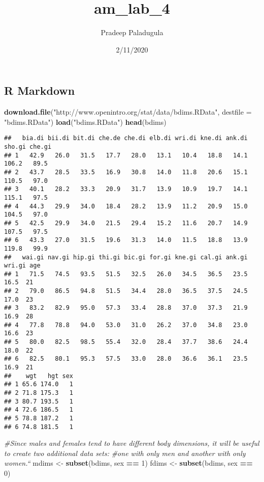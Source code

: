 \documentclass[]{article}
\title{am\_lab\_4}
\author{Pradeep Paladugula}
\date{2/11/2020}
\newenvironment{Shaded}{\begin{snugshade}}{\end{snugshade}}
\newcommand{\CommentTok}[1]{\textcolor[rgb]{0.56,0.35,0.01}{\textit{#1}}}
\newcommand{\DataTypeTok}[1]{\textcolor[rgb]{0.13,0.29,0.53}{#1}}
\newcommand{\DecValTok}[1]{\textcolor[rgb]{0.00,0.00,0.81}{#1}}
\newcommand{\KeywordTok}[1]{\textcolor[rgb]{0.13,0.29,0.53}{\textbf{#1}}}
\newcommand{\NormalTok}[1]{#1}
\newcommand{\OperatorTok}[1]{\textcolor[rgb]{0.81,0.36,0.00}{\textbf{#1}}}
\newcommand{\StringTok}[1]{\textcolor[rgb]{0.31,0.60,0.02}{#1}}
\begin{document}
\maketitle

\hypertarget{r-markdown}{%
\subsection{R Markdown}\label{r-markdown}}

\begin{Shaded}
\begin{Highlighting}[]
\KeywordTok{download.file}\NormalTok{(}\StringTok{"http://www.openintro.org/stat/data/bdims.RData"}\NormalTok{, }\DataTypeTok{destfile =} \StringTok{"bdims.RData"}\NormalTok{)}
\KeywordTok{load}\NormalTok{(}\StringTok{"bdims.RData"}\NormalTok{)}
\KeywordTok{head}\NormalTok{(bdims)}
\end{Highlighting}
\end{Shaded}

\begin{verbatim}
##   bia.di bii.di bit.di che.de che.di elb.di wri.di kne.di ank.di sho.gi che.gi
## 1   42.9   26.0   31.5   17.7   28.0   13.1   10.4   18.8   14.1  106.2   89.5
## 2   43.7   28.5   33.5   16.9   30.8   14.0   11.8   20.6   15.1  110.5   97.0
## 3   40.1   28.2   33.3   20.9   31.7   13.9   10.9   19.7   14.1  115.1   97.5
## 4   44.3   29.9   34.0   18.4   28.2   13.9   11.2   20.9   15.0  104.5   97.0
## 5   42.5   29.9   34.0   21.5   29.4   15.2   11.6   20.7   14.9  107.5   97.5
## 6   43.3   27.0   31.5   19.6   31.3   14.0   11.5   18.8   13.9  119.8   99.9
##   wai.gi nav.gi hip.gi thi.gi bic.gi for.gi kne.gi cal.gi ank.gi wri.gi age
## 1   71.5   74.5   93.5   51.5   32.5   26.0   34.5   36.5   23.5   16.5  21
## 2   79.0   86.5   94.8   51.5   34.4   28.0   36.5   37.5   24.5   17.0  23
## 3   83.2   82.9   95.0   57.3   33.4   28.8   37.0   37.3   21.9   16.9  28
## 4   77.8   78.8   94.0   53.0   31.0   26.2   37.0   34.8   23.0   16.6  23
## 5   80.0   82.5   98.5   55.4   32.0   28.4   37.7   38.6   24.4   18.0  22
## 6   82.5   80.1   95.3   57.5   33.0   28.0   36.6   36.1   23.5   16.9  21
##    wgt   hgt sex
## 1 65.6 174.0   1
## 2 71.8 175.3   1
## 3 80.7 193.5   1
## 4 72.6 186.5   1
## 5 78.8 187.2   1
## 6 74.8 181.5   1
\end{verbatim}

\begin{Shaded}
\begin{Highlighting}[]
\CommentTok{#Since males and females tend to have different body dimensions, it will be useful to create two additional data sets: }
\CommentTok{#one with only men and another with only women.``}
\NormalTok{mdims <-}\StringTok{ }\KeywordTok{subset}\NormalTok{(bdims, sex }\OperatorTok{==}\StringTok{ }\DecValTok{1}\NormalTok{)}
\NormalTok{fdims <-}\StringTok{ }\KeywordTok{subset}\NormalTok{(bdims, sex }\OperatorTok{==}\StringTok{ }\DecValTok{0}\NormalTok{)}
\end{Highlighting}
\end{Shaded}
\end{document}
